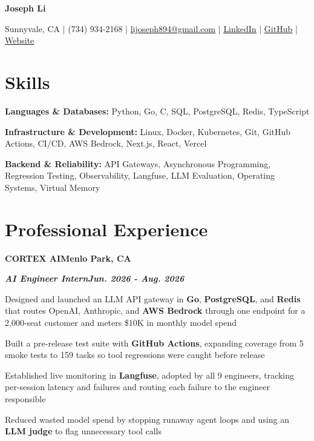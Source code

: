 \documentclass[10pt]{article}
\renewcommand{\resumeheader}[2]{%
  {\centering\fontsize{16}{18}\selectfont\bfseries #1\par}%
  \vspace{4pt}%
  {\centering\fontsize{10.5}{13}\selectfont #2\par}%
  \vspace{6pt}%
}
\renewcommand{\skill}[2]{\textbf{#1:} #2\par\vspace{1.5pt}}
\newcommand{\job}[4]{%
  \vspace{0pt}%
  \textbf{\MakeUppercase{#1}}\hfill\textbf{#2}\par
  \vspace{0.5pt}%
  \textbf{\textit{#3}}\hfill\textbf{\textit{#4}}\par
}
\begin{document}
\resumeheader{Joseph Li}{%
Sunnyvale, CA | (734) 934-2168 | \href{mailto:lijoseph894@gmail.com}{lijoseph894@gmail.com} | \href{https://www.linkedin.com/in/lijoseph894/}{\underline{LinkedIn}} | \href{https://github.com/josephl894}{\underline{GitHub}} | \href{https://josephl894.github.io}{\underline{Website}}}

\section{Skills}
\skill{Languages \& Databases}{Python, Go, C, SQL, PostgreSQL, Redis, TypeScript}
\skill{Infrastructure \& Development}{Linux, Docker, Kubernetes, Git, GitHub Actions, CI/CD, AWS Bedrock, Next.js, React, Vercel}
\skill{Backend \& Reliability}{API Gateways, Asynchronous Programming, Regression Testing, Observability, Langfuse, LLM Evaluation, Operating Systems, Virtual Memory}

\section{Professional Experience}
\job{Cortex AI}{Menlo Park, CA}{AI Engineer Intern}{Jun. 2026 - Aug. 2026}
\begin{bullets}
  \item Designed and launched an LLM API gateway in \textbf{Go}, \textbf{PostgreSQL}, and \textbf{Redis} that routes OpenAI, Anthropic, and \textbf{AWS Bedrock} through one endpoint for a 2,000-seat customer and meters \$10K in monthly model spend
  \item Built a pre-release test suite with \textbf{GitHub Actions}, expanding coverage from 5 smoke tests to 159 tasks so tool regressions were caught before release
  \item Established live monitoring in \textbf{Langfuse}, adopted by all 9 engineers, tracking per-session latency and failures and routing each failure to the engineer responsible
  \item Reduced wasted model spend by stopping runaway agent loops and using an \textbf{LLM judge} to flag unnecessary tool calls
\end{bullets}
\end{document}
